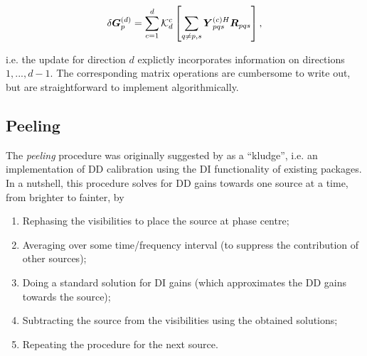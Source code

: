 \documentclass[useAMS,usenatbib]{mn2e}
\newcommand{\mat}[1]{{\bmath{#1}}}
\newcommand{\RR}{\mat{R}}
\newcommand{\GG}{\mat{G}}
\begin{document}
\[
\delta \GG^{(d)}_p = \sum\limits_{c=1}^d \KKK^c_d \left [ \sum\limits_{q\ne p,s} \YY^{(c)H}_{pqs} \RR_{pqs}  \right ],
\]

i.e. the update for direction $d$ explictly incorporates information on directions $1,...,d-1$. The corresponding matrix operations 
are cumbersome to write out, but are straightforward to implement algorithmically.








\subsection{Peeling}

The \emph{peeling} procedure was originally suggested by \citet{JEN:peeling} as a ``kludge'', i.e. an implementation of DD calibration 
using the DI functionality of existing packages. In a nutshell, this procedure solves for DD gains towards one source at a time, from
brighter to fainter, by

\begin{enumerate}
\item Rephasing the visibilities to place the source at phase centre;
\item Averaging over some time/frequency interval (to suppress the contribution of other sources);
\item Doing a standard solution for DI gains (which approximates the DD gains towards the source);
\item Subtracting the source from the visibilities using the obtained solutions;
\item Repeating the procedure for the next source.
\end{enumerate}
\end{document}
